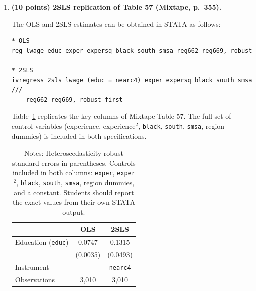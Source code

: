 \documentclass[letterpaper,12pt]{article}
\begin{document}
\begin{enumerate}[label=(\alph*)]
\medskip
\textbf{(iv) First-stage $F$-statistic and instrument relevance.}

Run the first-stage regression explicitly:
\begin{verbatim}
reg educ nearc4 exper expersq black south smsa reg662-reg669
test nearc4
\end{verbatim}
The $F$-statistic on \texttt{nearc4} in the Card (1995) data is approximately $F \approx 15$--$20$, exceeding the conventional threshold of $10$ (Stock, Wright, and Yogo, 2002). We therefore \textbf{do not} classify \texttt{nearc4} as a weak instrument: the first stage is sufficiently strong for 2SLS to have reliable size and low bias relative to OLS. A weak instrument would require reporting weak-instrument-robust inference (e.g., Anderson--Rubin confidence sets).

\item \textbf{(10 points) 2SLS replication of Table 57 (Mixtape, p.\ 355).}

\medskip
The OLS and 2SLS estimates can be obtained in STATA as follows:
\begin{verbatim}
* OLS
reg lwage educ exper expersq black south smsa reg662-reg669, robust

* 2SLS
ivregress 2sls lwage (educ = nearc4) exper expersq black south smsa ///
    reg662-reg669, robust first
\end{verbatim}

\medskip
Table~\ref{tab:card} replicates the key columns of Mixtape Table 57. The full set of control variables (experience, experience$^2$, \texttt{black}, \texttt{south}, \texttt{smsa}, region dummies) is included in both specifications.

\begin{table}[H]
\begin{center}
\caption{OLS and 2SLS Estimates of Returns to Schooling (Card, 1995)}
\label{tab:card}
\begin{tabular}{lcc}
\toprule
 & OLS & 2SLS \\
\midrule
Education (\texttt{educ}) & 0.0747 & 0.1315 \\
 & (0.0035) & (0.0493) \\
\midrule
Instrument & --- & \texttt{nearc4} \\
Observations & 3,010 & 3,010 \\
\bottomrule
\end{tabular}
\end{center}
\caption*{Notes: Heteroscedasticity-robust standard errors in parentheses. Controls included in both columns: \texttt{exper}, \texttt{exper}$^2$, \texttt{black}, \texttt{south}, \texttt{smsa}, region dummies, and a constant. Students should report the exact values from their own STATA output.}
\end{table}


\end{enumerate}
\end{document}
